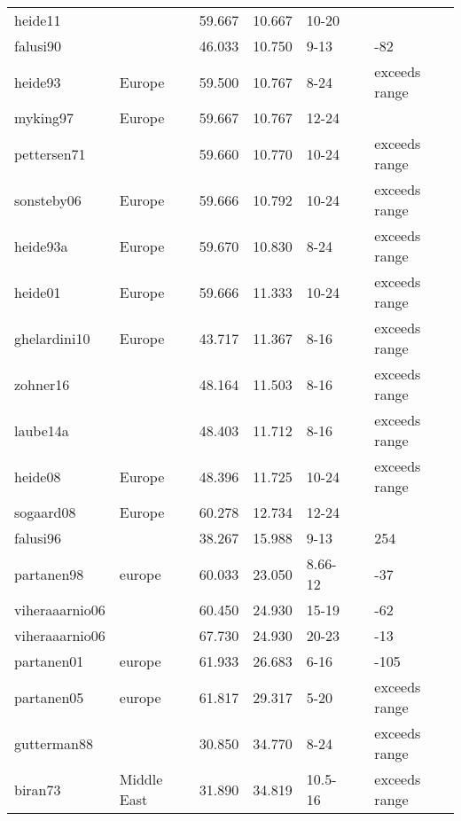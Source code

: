 \documentclass{article}
\begin{document}
\begin{table}[ht]
\begin{tabular}{|p{}|p{}|p{}|p{}|p{}|p{}|p{}|}
  heide11 &  & 59.667 & 10.667 & 10-20 &  &  \\ 
  falusi90 &  & 46.033 & 10.750 & 9-13 &  & -82 \\ 
  heide93 & Europe & 59.500 & 10.767 & 8-24 &  & exceeds range \\ 
  myking97 & Europe & 59.667 & 10.767 & 12-24 &  &  \\ 
  pettersen71 &  & 59.660 & 10.770 & 10-24 &  & exceeds range \\ 
  sonsteby06 & Europe & 59.666 & 10.792 & 10-24 &  & exceeds range \\ 
  heide93a & Europe & 59.670 & 10.830 & 8-24 &  & exceeds range \\ 
  heide01 & Europe & 59.666 & 11.333 & 10-24 &  & exceeds range \\ 
  ghelardini10 & Europe & 43.717 & 11.367 & 8-16 &  & exceeds range \\ 
  zohner16 &  & 48.164 & 11.503 & 8-16 &  & exceeds range \\ 
  laube14a &  & 48.403 & 11.712 & 8-16 &  & exceeds range \\ 
  heide08 & Europe & 48.396 & 11.725 & 10-24 &  & exceeds range \\ 
  sogaard08 & Europe & 60.278 & 12.734 & 12-24 &  &  \\ 
  falusi96 &  & 38.267 & 15.988 & 9-13 &  & 254 \\ 
  partanen98 & europe & 60.033 & 23.050 & 8.66-12 &  & -37 \\ 
  viheraaarnio06 &  & 60.450 & 24.930 & 15-19 &  & -62 \\ 
  viheraaarnio06 &  & 67.730 & 24.930 & 20-23 &  & -13 \\ 
  partanen01 & europe & 61.933 & 26.683 & 6-16 &  & -105 \\ 
  partanen05 & europe & 61.817 & 29.317 & 5-20 &  & exceeds range \\ 
  gutterman88 &  & 30.850 & 34.770 & 8-24 &  & exceeds range \\ 
  biran73 & Middle East & 31.890 & 34.819 & 10.5-16 &  & exceeds range \\ 
   \hline
\end{tabular}
\end{table}\clearpage
\end{document}

